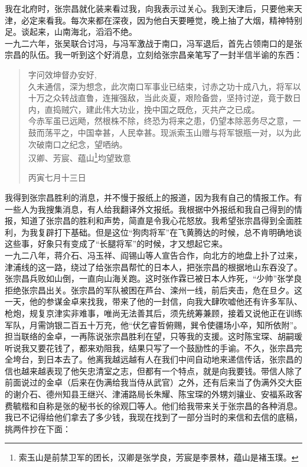 我在北府时，张宗昌就化装来看过我，向我表示过关心。我到天津后，只要他来天津，必定来看我。每次来都在深夜，因为他白天要睡觉，晚上抽了大烟，精神特别足。谈起来，山南海北，滔滔不绝。\\

一九二六年，张吴联合讨冯，与冯军激战于南口，冯军退后，首先占领南口的是张宗昌的队伍。我一听到这个好消息，立刻给张宗昌亲笔写了一封半信半谕的东西：\\

\begin{quote}
	字问效坤督办安好,\\

久未通信，深为想念，此次南口军事业已结束，讨赤之功十成八九，将军以十万之众转战直鲁，连摧强敌，当此炎夏，艰险备尝，坚持讨逆，竟于数日内，直捣贼穴，建此伟大功业，挽中国之既危，灭共产之已成。\\

今赤军虽已远飏，然根株不除，终恐为将来之患，仍望本除恶务尽之意，一鼓而荡平之，中国幸甚，人民幸甚。现派索玉山赠与将军银瓶一对，以为此次破南口之纪念，望哂纳。\\

汉卿、芳宸、蕴山\footnote{索玉山是前禁卫军的团长，汉卿是张学良，芳宸是李景林，蕴山是褚玉璞。}均望致意\\

\begin{flushright}
	丙寅七月十三日\\
\end{flushright}
\end{quote}

我得到张宗昌胜利的消息，并不慢于报纸上的报道，因为我有自己的情报工作。有一些人为我搜集消息，有人给我翻译外文报纸。我根据中外报纸和我自己得到的情报，知道了张宗昌的胜利和声势，简直是令我心花怒放。我希望张宗昌得到全面胜利，为我复辟打下基础。但是这位“狗肉将军”在飞黄腾达的时候，总不肯明确地谈这些事，好象只有变成了“长腿将军”的时候，才又想起它来。\\

一九二八年，蒋介石、冯玉祥、阎锡山等人宣告合作，向北方的地盘上扑了过来，津浦线的这一路，绕过了给张宗昌帮忙的日本人，把张宗昌的根据地山东吞没了。张宗昌兵败如山倒，一直向山海关跑。这时张作霖已被日本人炸死，“少帅”张学良拒绝张宗昌出关。张宗昌的军队被困在芦台、滦州一线，前后夹击，危在旦夕。这一天，他的参谋金卓来找我，带来了他的一封信，向我大肆吹嘘他还有许多军队、枪炮，规复京津实非难事，唯尚无法善其后，须先统筹兼顾，接着又说他正在训练军队，月需饷银二百五十万充，他“伏乞睿哲俯赐，巽令使疆场小卒，知所依附”。担当联络的金卓，一再陈说张宗昌胜利在望，只等我的支援。这时陈宝琛、胡嗣瑗听说我又要花钱了，都来劝阻我，结果只写了一个鼓励性的手谕。不久，张宗昌完全垮台，到日本去了。他离我越远越有人在我们中间自动地来递信传话，张宗昌的信也越来越表现了他矢忠清室之志，但都有一个特点，就是向我要钱。带信人除了前面说过的金卓（后来在伪满给我当侍从武官）之外，还有后来当了伪满外交大臣的谢介石、德州知县王继兴、津浦路局长朱耀、陈宝琛的外甥刘骧业、安福系政客费毓楷和自称是张的秘书长的徐观囗等人。他们给我带来关于张宗昌的各种消息。我已不记得给他们拿去了多少钱，我现在找到了一部分当时的来信和去信的底稿，挑两件抄在下面：\\

